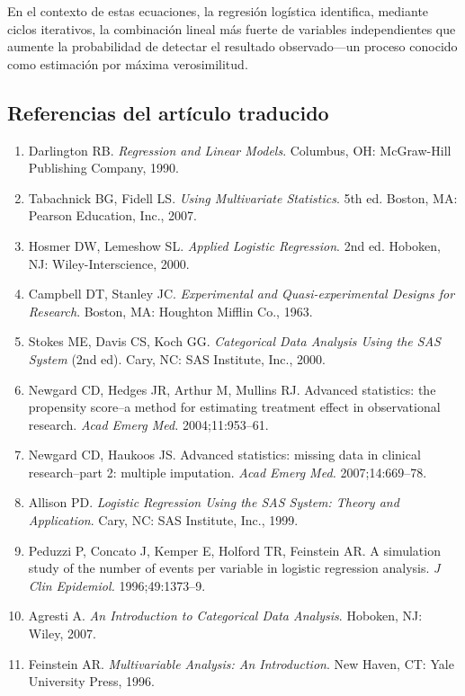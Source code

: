En el contexto de estas ecuaciones, la regresión logística identifica, mediante ciclos iterativos, la combinación lineal más fuerte de variables independientes que aumente la probabilidad de detectar el resultado observado—un proceso conocido como estimación por máxima verosimilitud.

\subsection{Referencias del artículo traducido}

\begin{enumerate}
  \item Darlington RB. \textit{Regression and Linear Models}. Columbus, OH: McGraw-Hill Publishing Company, 1990.
  \item Tabachnick BG, Fidell LS. \textit{Using Multivariate Statistics}. 5th ed. Boston, MA: Pearson Education, Inc., 2007.
  \item Hosmer DW, Lemeshow SL. \textit{Applied Logistic Regression}. 2nd ed. Hoboken, NJ: Wiley-Interscience, 2000.
  \item Campbell DT, Stanley JC. \textit{Experimental and Quasi-experimental Designs for Research}. Boston, MA: Houghton Mifflin Co., 1963.
  \item Stokes ME, Davis CS, Koch GG. \textit{Categorical Data Analysis Using the SAS System} (2nd ed). Cary, NC: SAS Institute, Inc., 2000.
  \item Newgard CD, Hedges JR, Arthur M, Mullins RJ. Advanced statistics: the propensity score--a method for estimating treatment effect in observational research. \textit{Acad Emerg Med.} 2004;11:953–61.
  \item Newgard CD, Haukoos JS. Advanced statistics: missing data in clinical research--part 2: multiple imputation. \textit{Acad Emerg Med.} 2007;14:669–78.
  \item Allison PD. \textit{Logistic Regression Using the SAS System: Theory and Application}. Cary, NC: SAS Institute, Inc., 1999.
  \item Peduzzi P, Concato J, Kemper E, Holford TR, Feinstein AR. A simulation study of the number of events per variable in logistic regression analysis. \textit{J Clin Epidemiol.} 1996;49:1373–9.
  \item Agresti A. \textit{An Introduction to Categorical Data Analysis}. Hoboken, NJ: Wiley, 2007.
  \item Feinstein AR. \textit{Multivariable Analysis: An Introduction}. New Haven, CT: Yale University Press, 1996.

\end{enumerate}
